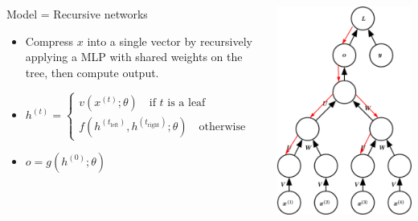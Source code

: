 \documentclass{beamer}
\begin{document}
\begin{frame}
\begin{columns}
\begin{column}{0.75\textwidth}
            Model = Recursive networks
            \begin{itemize}
                \item Compress $x$ into a single vector by recursively applying a MLP with shared weights on the tree, then compute output.
                \item $h^{(t)} = \begin{cases}
                        v(x^{(t)}; \theta) \quad\text{if $t$ is a leaf} \\
                        f(h^{(t_\text{left})}, h^{(t_\text{right})}; \theta) \quad\text{otherwise}
                    \end{cases}$
                \item $o = g(h^{(0)}; \theta)$
            \end{itemize}
        \end{column}
        \begin{column}{0.24\textwidth}
            \centering
            \includegraphics[scale=0.2]{figures/rnn3.png}
        \end{column}
    \end{columns}


\end{frame}
\end{document}
